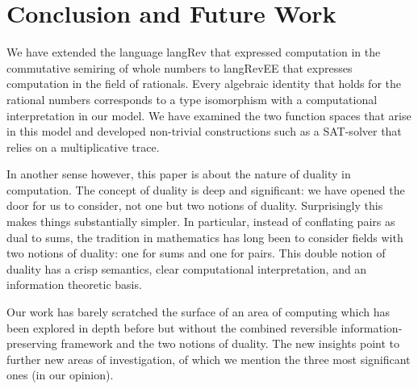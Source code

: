 \documentclass[preprint]{sigplanconf}
\begin{document}
\section{Conclusion and Future Work}
\label{sec:conc}

We have extended the language {{langRev}} that expressed computation
in the commutative semiring of whole numbers to {{langRevEE}} that
expresses computation in the field of rationals.  Every algebraic
identity that holds for the rational numbers corresponds to a type
isomorphism with a computational interpretation in our model. We have
examined the two function spaces that arise in this model and
developed non-trivial constructions such as a SAT-solver that relies
on a multiplicative trace.

In another sense however, this paper is about the nature of duality in
computation. 
The concept of duality is deep and significant: we have opened the
door for us to consider, not one but two notions of
duality. Surprisingly this makes things substantially simpler. In
particular, instead of conflating pairs as dual to sums, the tradition
in mathematics has long been to consider fields with two notions of
duality: one for sums and one for pairs. This double notion of duality
has a crisp semantics, clear computational interpretation, and an
information theoretic basis.

Our work has barely scratched the surface of an area of computing which has
been explored in depth before but without the combined reversible
information-preserving framework and the two notions of duality. The new
insights point to further new areas of investigation, of which we mention
the three most significant ones (in our opinion).

\end{document}
